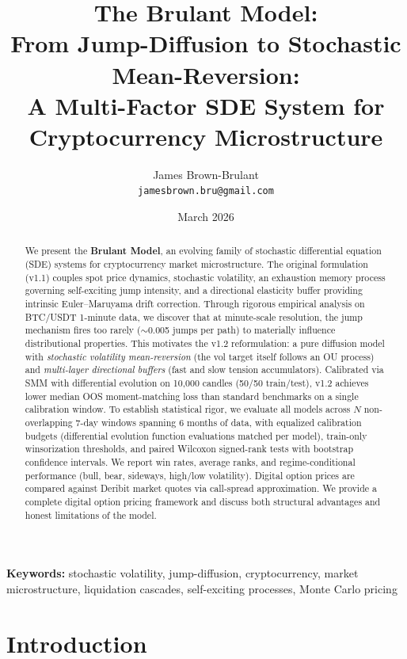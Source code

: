 \documentclass[11pt,a4paper]{article}
\title{%
  \textbf{The Brulant Model:}\\[0.3em]
  \large From Jump-Diffusion to Stochastic Mean-Reversion:\\
  A Multi-Factor SDE System for Cryptocurrency Microstructure
}
\author{
  James Brown-Brulant\\
  \texttt{jamesbrown.bru@gmail.com}
}
\date{March 2026}
\begin{document}
\maketitle

\begin{abstract}
We present the \textbf{Brulant Model}, an evolving family of stochastic
differential equation (SDE) systems for cryptocurrency market microstructure.
The original formulation (v1.1) couples spot price dynamics, stochastic
volatility, an exhaustion memory process governing self-exciting jump intensity,
and a directional elasticity buffer providing intrinsic Euler--Maruyama drift
correction. Through rigorous empirical analysis on BTC/USDT 1-minute data,
we discover that at minute-scale resolution, the jump mechanism fires too
rarely ($\sim$0.005 jumps per path) to materially influence distributional
properties. This motivates the v1.2 reformulation: a pure diffusion model
with \emph{stochastic volatility mean-reversion} (the vol target itself
follows an OU process) and \emph{multi-layer directional buffers} (fast and
slow tension accumulators). Calibrated via SMM with differential evolution
on 10{,}000 candles (50/50 train/test), v1.2 achieves lower median OOS
moment-matching loss than standard benchmarks on a single calibration window.
To establish statistical rigor, we evaluate all models across $N$
non-overlapping 7-day windows spanning 6 months of data, with equalized
calibration budgets (differential evolution function evaluations matched
per model), train-only winsorization thresholds, and paired Wilcoxon
signed-rank tests with bootstrap confidence intervals. We report win rates,
average ranks, and regime-conditional performance (bull, bear, sideways,
high/low volatility). Digital option prices are compared against Deribit
market quotes via call-spread approximation. We provide
a complete digital option pricing framework and discuss both structural
advantages and honest limitations of the model.
\end{abstract}

\bigskip
\noindent\textbf{Keywords:} stochastic volatility, jump-diffusion, cryptocurrency,
market microstructure, liquidation cascades, self-exciting processes, Monte Carlo pricing

\tableofcontents
\newpage

\section{Introduction}
\label{sec:intro}
\end{document}
